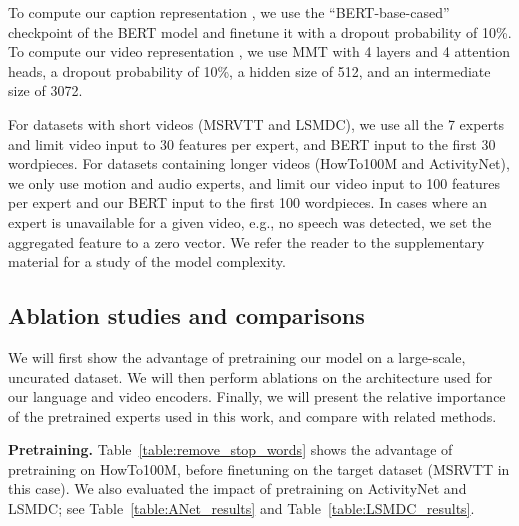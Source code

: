 \documentclass[runningheads]{llncs}
\begin{document}
To compute our caption representation , we use the ``BERT-base-cased'' checkpoint of the BERT model and finetune it with a dropout probability of 10\%. To compute our video representation , we use MMT with 4 layers and 4 attention heads, a dropout probability of 10\%, a hidden size  of 512, and an intermediate size of 3072.




For datasets with short videos (MSRVTT and LSMDC), we use all the 7 experts and limit video input to 30 features per expert, and BERT input to the first 30 wordpieces. 
For datasets containing longer videos (HowTo100M and ActivityNet), we only use motion and audio experts, and limit our video input to 100 features per expert and our BERT input to the first 100 wordpieces.
In cases where an expert is unavailable for a given video, e.g., no speech was detected, we set the aggregated feature  to a zero vector. We refer the reader to the supplementary material for a study of the model complexity.

\subsection{Ablation studies and comparisons}
We will first show the advantage of pretraining our model on a large-scale, uncurated dataset. We will then perform ablations on the architecture used for our language and video encoders. Finally, we will present the relative importance of the  pretrained experts used in this work, and compare with related methods.

\noindent\textbf{Pretraining.} Table~\ref{table:remove_stop_words} shows the advantage of pretraining on HowTo100M, before finetuning on the target dataset (MSRVTT in this case). 
We also evaluated the impact of pretraining on ActivityNet and LSMDC; see Table~\ref{table:ANet_results} and Table~\ref{table:LSMDC_results}.
\end{document}
